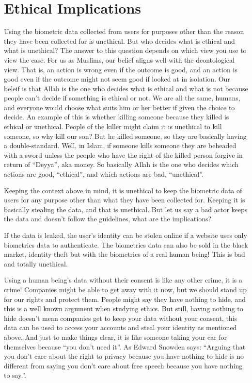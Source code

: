 \documentclass[conference]{IEEEtran}
\begin{document}
\section{Ethical Implications}

Using the biometric data collected from users for purposes other than the reason they have been collected for is unethical. But who decides what is ethical and what is unethical? The answer to this question depends on which view you use to view the case. For us as Muslims, our belief aligns well with the deontological view. That is, an action is wrong even if the outcome is good, and an action is good even if the outcome might not seem good if looked at in isolation. Our beleif is that Allah is the one who decides what is ethical and what is not because people can't decide if something is ethical or not. We are all the same, humans, and everyone would choose what suits him or her better if given the choice to decide. An example of this is whether killing someone because they killed is ethical or unethical. People of the killer might claim it is unethical to kill someone, so why kill our son? But he killed someone, so they are basically having a double-standard. Well, in Islam, if someone kills someone they are beheaded with a sword unless the people who have the right of the killed person forgive in return of ``Deyya'', aka money. So basically Allah is the one who decides which actions are good, ``ethical'', and which actions are bad, ``unethical''.

Keeping the context above in mind, it is unethical to keep the biometric data of users for any purpose other than what they have been collected for. Keeping it is basically stealing the data, and that is unethical. But let us say a bad actor keeps the data and doesn't follow the guidelines, what are the implications? 

If the data is leaked, the user's identity can be stolen online if a website uses only biometrics data to authenticate. The biometrics data can also be sold in the black market, identity theft but with the biometrics of a real human being! This is bad and totally unethical.

Using a human being's data without their consent is like any other crime, it is a crime! Companies might be able to get away with it now, but we should stand up for our rights and protect them. People might say they have nothing to hide, and this is a well known argument when studying ethics. But still, having nothing to hide doesn't mean companies get to keep your data without your consent, this data can be used to access your accounts and steal your identity as mentioned above. And just to make things clear, it is like someone taking your car for themselves because ``you don't need it''. As Edward Snowden says: ``Arguing that you don't care about the right to privacy because you have nothing to hide is no different from saying you don't care about free speech because you have nothing to say.''. \cite{snowden_privacy_quote}
\end{document}
